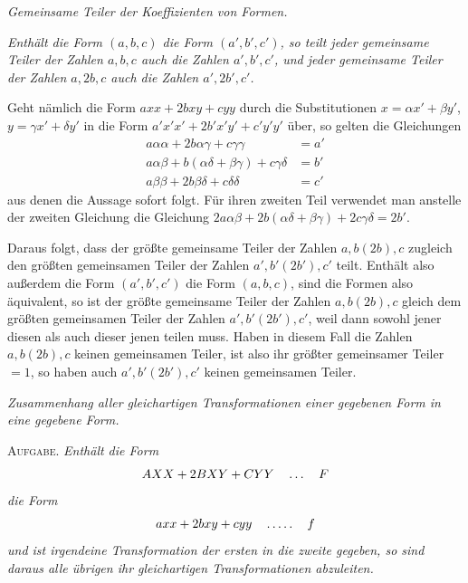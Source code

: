 \begin{center}
\textit{Gemeinsame Teiler der Koeffizienten von Formen.}
\end{center}
\textit{Enthält die Form $(a,b,c)$ die Form $(a',b',c')$, so teilt jeder gemeinsame Teiler der Zahlen $a,b,c$ auch die Zahlen $a',b',c'$, und jeder gemeinsame Teiler der Zahlen $a,2b,c$ auch die Zahlen $a',2b',c'$.}

Geht nämlich die Form $axx+2bxy+cyy$ durch die Substitutionen $x=\alpha x'+\beta y'$, $y=\gamma x'+\delta y'$ in die Form $a'x'x'+2b'x'y'+c'y'y'$ über, so gelten die Gleichungen
\[
\begin{aligned}
a\alpha\alpha+2b\alpha\gamma+c\gamma\gamma&=a'\\
a\alpha\beta+b(\alpha\delta+\beta\gamma)+c\gamma\delta&=b'\\
a\beta\beta+2b\beta\delta+c\delta\delta&=c'
\end{aligned}
\]
aus denen die Aussage sofort folgt. Für ihren zweiten Teil verwendet man anstelle der zweiten Gleichung die Gleichung $2a\alpha\beta+2b(\alpha\delta+\beta\gamma)+2c\gamma\delta=2b'$.

Daraus folgt, dass der größte gemeinsame Teiler der Zahlen $a,b(2b),c$ zugleich den größten gemeinsamen Teiler der Zahlen $a',b'(2b'),c'$ teilt. Enthält also außerdem die Form $(a',b',c')$ die Form $(a,b,c)$, sind die Formen also äquivalent, so ist der größte gemeinsame Teiler der Zahlen $a,b(2b),c$ gleich dem größten gemeinsamen Teiler der Zahlen $a',b'(2b'),c'$, weil dann sowohl jener diesen als auch dieser jenen teilen muss. Haben in diesem Fall die Zahlen $a,b(2b),c$ keinen gemeinsamen Teiler, ist also ihr größter gemeinsamer Teiler $=1$, so haben auch $a',b'(2b'),c'$ keinen gemeinsamen Teiler.

\begin{center}
\textit{Zusammenhang aller gleichartigen Transformationen einer gegebenen Form in eine gegebene Form.}
\end{center}
\textsc{Aufgabe.} \textit{Enthält die Form}
\[
AXX+2BXY+CYY\quad\mathinner{.\,.\,.}\quad F
\]
\textit{die Form}
\[
axx+2bxy+cyy\quad\mathinner{.\,.\,.\,.\,.}\quad f
\]
\textit{und ist irgendeine Transformation der ersten in die zweite gegeben, so sind daraus alle übrigen ihr gleichartigen Transformationen abzuleiten.}

